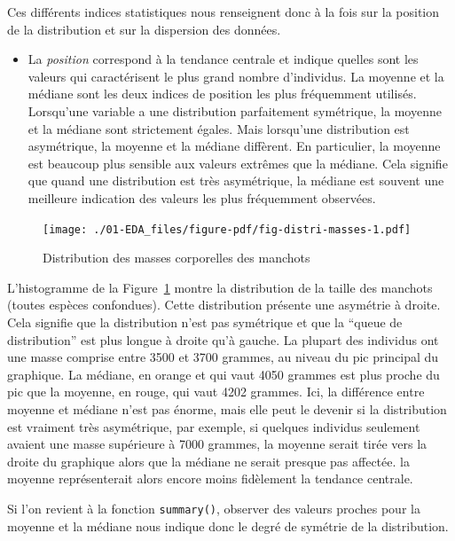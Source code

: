 \documentclass[
  a4paper,
  DIV=11,
  numbers=noendperiod,
  oneside]{scrreprt}
\providecommand{\tightlist}{%
  \setlength{\itemsep}{0pt}\setlength{\parskip}{0pt}}\usepackage{longtable,booktabs,array}
\begin{document}
Ces différents indices statistiques nous renseignent donc à la fois sur
la position de la distribution et sur la dispersion des données.

\begin{itemize}
\tightlist
\item
  La \emph{position} correspond à la tendance centrale et indique
  quelles sont les valeurs qui caractérisent le plus grand nombre
  d'individus. La moyenne et la médiane sont les deux indices de
  position les plus fréquemment utilisés. Lorsqu'une variable a une
  distribution parfaitement symétrique, la moyenne et la médiane sont
  strictement égales. Mais lorsqu'une distribution est asymétrique, la
  moyenne et la médiane diffèrent. En particulier, la moyenne est
  beaucoup plus sensible aux valeurs extrêmes que la médiane. Cela
  signifie que quand une distribution est très asymétrique, la médiane
  est souvent une meilleure indication des valeurs les plus fréquemment
  observées.
\end{itemize}

\begin{figure}

{\centering \texttt{[image: ./01-EDA\_files/figure-pdf/fig-distri-masses-1.pdf]}

}

\caption{\label{fig-distri-masses}Distribution des masses corporelles
des manchots}

\end{figure}

L'histogramme de la Figure~\ref{fig-distri-masses} montre la
distribution de la taille des manchots (toutes espèces confondues).
Cette distribution présente une asymétrie à droite. Cela signifie que la
distribution n'est pas symétrique et que la ``queue de distribution''
est plus longue à droite qu'à gauche. La plupart des individus ont une
masse comprise entre 3500 et 3700 grammes, au niveau du pic principal du
graphique. La médiane, en orange et qui vaut 4050 grammes est plus
proche du pic que la moyenne, en rouge, qui vaut 4202 grammes. Ici, la
différence entre moyenne et médiane n'est pas énorme, mais elle peut le
devenir si la distribution est vraiment très asymétrique, par exemple,
si quelques individus seulement avaient une masse supérieure à 7000
grammes, la moyenne serait tirée vers la droite du graphique alors que
la médiane ne serait presque pas affectée. la moyenne représenterait
alors encore moins fidèlement la tendance centrale.

Si l'on revient à la fonction \texttt{summary()}, observer des valeurs
proches pour la moyenne et la médiane nous indique donc le degré de
symétrie de la distribution.
\end{document}
